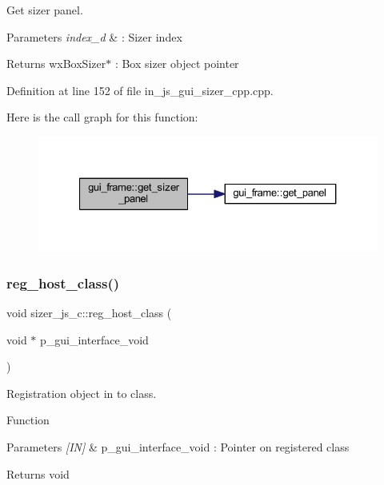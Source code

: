 Get sizer panel. 


\begin{DoxyParams}{Parameters}
{\em index\+\_\+d} & \+: Sizer index \\
\hline
\end{DoxyParams}
\begin{DoxyReturn}{Returns}
wx\+Box\+Sizer$\ast$ \+: Box sizer object pointer 
\end{DoxyReturn}


Definition at line 152 of file in\+\_\+js\+\_\+gui\+\_\+sizer\+\_\+cpp.\+cpp.

Here is the call graph for this function\+:
\nopagebreak
\begin{figure}[H]
\begin{center}
\leavevmode
\includegraphics[width=327pt]{group___sizer_ga32d54b623791c8cf2e52e3d099dd398e_cgraph}
\end{center}
\end{figure}
\mbox{\label{group___sizer_ga1820ac567e12588d3bf6011400fbcebe}} 
\subsubsection{reg\_host\_class()}
{\footnotesize\ttfamily void sizer\+\_\+js\+\_\+c\+::reg\+\_\+host\+\_\+class (\begin{DoxyParamCaption}\item[{void $\ast$}]{p\+\_\+gui\+\_\+interface\+\_\+void }\end{DoxyParamCaption})}



Registration object in to class. 

Function
\begin{DoxyParams}{Parameters}
{\em \mbox{[}\+I\+N\mbox{]}} & p\+\_\+gui\+\_\+interface\+\_\+void \+: Pointer on registered class \\
\hline
\end{DoxyParams}
\begin{DoxyReturn}{Returns}
void 
\end{DoxyReturn}


